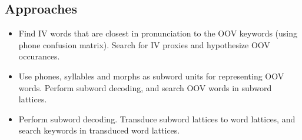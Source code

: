 \documentclass[landscape,final,archE1,fontscale=0.3]{baposter}
\begin{document}
\begin{poster}
{\subsection*{Approaches}
\begin{itemize}
\item Find IV words that are closest in pronunciation to the OOV keywords (using phone confusion matrix). Search for IV proxies
and hypothesize OOV occurances.
\item Use phones, syllables and morphs as subword units for representing OOV words. Perform subword decoding, and search OOV words in subword lattices.
\item Perform subword decoding. Transduce subword lattices to word lattices, and search keywords in transduced word lattices.
\end{itemize}
}


\end{poster}
\end{document}
